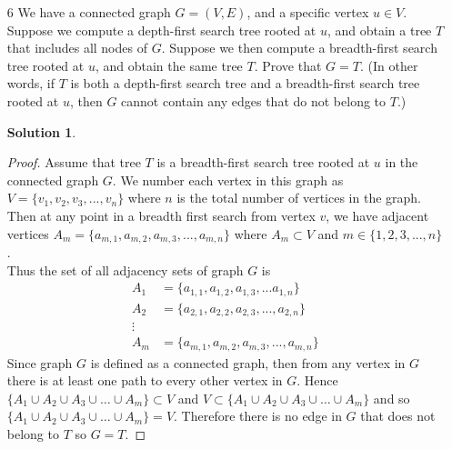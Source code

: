 \documentclass[12pt]{article}
\theoremstyle{definition}
\newtheorem*{solution}{Solution} %
\theoremstyle{plain}
\begin{document}
\begin{enumerate}
\item[6] We have a connected graph $G=(V,E)$, and a specific vertex $u\in V$. Suppose we compute a depth-first search tree rooted at $u$, and obtain a tree $T$ that includes all nodes of $G$. Suppose we then compute a breadth-first search tree rooted at $u$, and obtain the same tree $T$. Prove that $G=T$. (In other words, if $T$ is both a depth-first search tree and a breadth-first search tree rooted at $u$, then $G$ cannot contain any edges that do not belong to $T$.)
\begin{solution}
\begin{proof}
Assume that tree $T$ is a breadth-first search tree rooted at $u$ in the connected graph $G$. We number each vertex in this graph as $V=\{v_1, v_2, v_3,...,v_n\}$ where $n$ is the total number of vertices in the graph. Then at any point in a breadth first search from vertex $v$, we have adjacent vertices $A_m=\{a_{m,1},a_{m,2},a_{m,3},...,a_{m,n}\}$ where $A_m\subset V$ and $m\in \{1,2,3,...,n\}$.\\
Thus the set of all adjacency sets of graph $G$ is
\begin{align*}
A_1 &= \{a_{1,1}, a_{1,2}, a_{1,3}, ... a_{1,n}\}\\
A_2 &= \{a_{2,1},a_{2,2},a_{2,3},...,a_{2,n}\}\\
\vdots\\
A_m &= \{a_{m,1},a_{m,2},a_{m,3},...,a_{m,n}\}
\end{align*}
Since graph $G$ is defined as a connected graph, then from any vertex in $G$ there is at least one path to every other vertex in $G$. Hence $\{A_1 \cup A_2 \cup A_3 \cup \dots \cup A_m\}  \subset V$ and $V \subset \{A_1 \cup A_2 \cup A_3 \cup \dots \cup A_m\}$ and so $\{A_1 \cup A_2 \cup A_3 \cup \dots \cup A_m\} = V$.
Therefore there is no edge in $G$ that does not belong to $T$ so $G = T$.
\end{proof}
\end{solution}


\end{enumerate}
\end{document}
